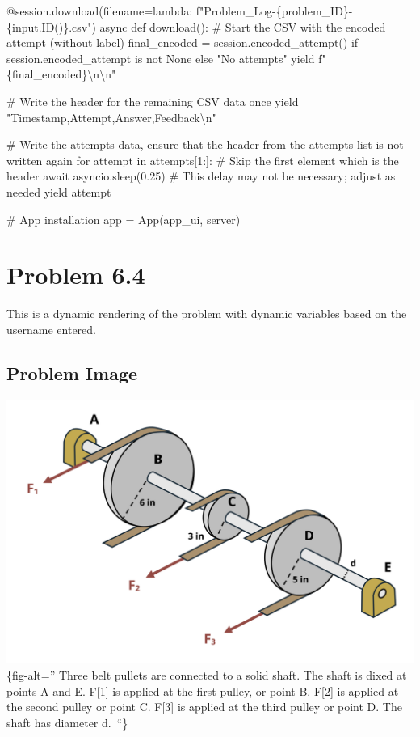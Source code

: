 \documentclass[
  letterpaper,
  DIV=11,
  numbers=noendperiod]{scrreprt}
\newenvironment{Shaded}{\begin{snugshade}}{\end{snugshade}}
\newcommand{\NormalTok}[1]{\textcolor[rgb]{0.00,0.23,0.31}{#1}}
\begin{document}
\begin{Shaded}
\begin{Highlighting}[]
\NormalTok{    @session.download(filename=lambda: f"Problem\_Log{-}\{problem\_ID\}{-}\{input.ID()\}.csv")}
\NormalTok{    async def download():}
\NormalTok{        \# Start the CSV with the encoded attempt (without label)}
\NormalTok{        final\_encoded = session.encoded\_attempt() if session.encoded\_attempt is not None else "No attempts"}
\NormalTok{        yield f"\{final\_encoded\}\textbackslash{}n\textbackslash{}n"}
        
\NormalTok{        \# Write the header for the remaining CSV data once}
\NormalTok{        yield "Timestamp,Attempt,Answer,Feedback\textbackslash{}n"}
        
\NormalTok{        \# Write the attempts data, ensure that the header from the attempts list is not written again}
\NormalTok{        for attempt in attempts[1:]:  \# Skip the first element which is the header}
\NormalTok{            await asyncio.sleep(0.25)  \# This delay may not be necessary; adjust as needed}
\NormalTok{            yield attempt}


\NormalTok{\# App installation}
\NormalTok{app = App(app\_ui, server)}
\end{Highlighting}
\end{Shaded}

\chapter*{Problem 6.4}\label{problem-6.4}


This is a dynamic rendering of the problem with dynamic variables based
on the username entered.

\section*{Problem Image}\label{problem-image-62}


\includegraphics{images/276.png}\{fig-alt='' Three belt pullets are
connected to a solid shaft. The shaft is dixed at points A and E.
F{[}1{]} is applied at the first pulley, or point B. F{[}2{]} is applied
at the second pulley or point C. F{[}3{]} is applied at the third pulley
or point D. The shaft has diameter d.~``\}
\end{document}
